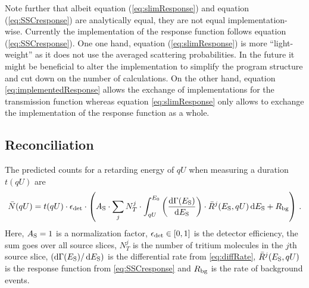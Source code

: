 Note further that albeit equation (\ref{eq:slimResponse}) and equation (\ref{eq:SSCresponse}) are analytically equal, they are not equal implementation-wise. Currently the implementation of the response function follows equation (\ref{eq:SSCresponse}). One one hand, equation (\ref{eq:slimResponse}) is more ``light-weight'' as it does not use the averaged scattering probabilities. In the future it might be beneficial to alter the implementation to simplify the program structure and cut down on the number of calculations. On the other hand, equation \eqref{eq:implementedResponse} allows the exchange of implementations for the transmission function whereas equation \eqref{eq:slimResponse} only allows to exchange the implementation of the response function as a whole.

\subsection{Reconciliation}
The predicted counts for a retarding energy of $qU$ when measuring a duration $t(qU)$ are
\begin{equation}
	\label{eq:countsSCCFinal}
	\bar{N}(qU) = t(qU) \cdot \epsilon_\mathrm{det} \cdot \left(
		A_\mathrm{S} \cdot
		 \sum_{j}
			N_T^j \cdot
			\int_{qU}^{E_0} 
				\left(\frac{\mathop{}\!\mathrm{d} \Gamma(E_\mathrm{S})}{ \mathop{}\!\mathrm{d} E_\mathrm{S}}\right) \cdot 
				\bar{R}^j(E_\mathrm{S}, qU) 
			\mathop{}\!\mathrm{d} E_\mathrm{S} +
			R_\mathrm{bg}
		\right)
	\text{\,.}
\end{equation}
Here, $A_\mathrm{S}=1$ is a normalization factor, $\epsilon_\mathrm{det} \in [0,1]$ is the detector efficiency, the sum goes over all source slices, $N_T^j$ is the number of tritium molecules in the $j$th source slice, $\left(\mathop{}\!\mathrm{d} \Gamma(E_\mathrm{S}) / \mathop{}\!\mathrm{d} E_\mathrm{S} \right)$ is the differential rate from \eqref{eq:diffRate}, $\bar{R}^j(E_\mathrm{S}, qU)$ is the response function from \eqref{eq:SSCresponse} and $R_\mathrm{bg}$ is the rate of background events.

